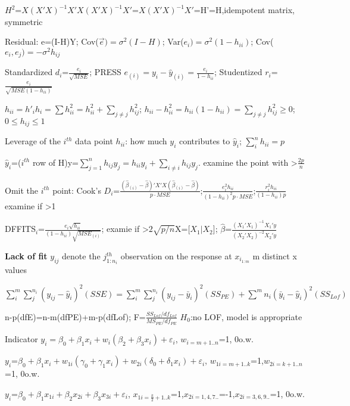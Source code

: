 \documentclass[
  10pt,
  twocolumn]{article}
\begin{document}
\(H^2\)=\(X(X'X)^{-1}X'X(X'X)^{-1}X'\)=\(X(X'X)^{-1}X'\)=H'=H,idempotent
matrix, symmetric

Residual: e=(I-H)Y; Cov(\(\vec{e})=\sigma^2(I-H)\);
Var(\(e_i)=\sigma^2(1-h_{ii})\); Cov(\(e_i,e_j)=-\sigma^2h_{ij}\)

Standardized \(d_i\)=\(\frac{e_i}{\sqrt{MSE}}\); PRESS
\(e_{(i)}=y_i-\hat y_{(i)}=\frac{e_i}{1-h_{ii}}\); Studentized
\(r_i\)=\(\frac{e_i}{\sqrt{MSE(1-h_{ii})}}\)

\(h_{ii}=h'_{i}h_{i}=\sum h_{ii}^2=h_{ii}^2+\sum_{j\neq j} h_{ij}^2\);
\(h_{ii}-h_{ii}^2=h_{ii}(1-h_{ii})=\sum_{j\neq j} h_{ij}^2\ge 0\);
\(0\le h_{ij}\le1\)

Leverage of the \(i^{th}\) data point \(h_{ii}\): how much \(y_i\)
contributes to \(\hat y_i\); \(\sum_i^nh_{ii}=p\)

\(\hat y_i\)=(\(i^{th}\) row of
H)y=\(\sum_{j=1}^nh_{ij}y_j=h_{ii}y_i+\sum_{i\neq i}h_{ij}y_j\). examine
the point with \textgreater{}\(\frac{2p}n\)

Omit the \(i^{th}\) point: Cook's
\(D_i\)=\(\frac{(\hat\beta_{(i)}-\hat\beta)'X'X(\hat\beta_{(i)}-\hat\beta)}{p\cdot MSE}\);\(\frac{e_i^2h_{ii}}{(1-h_{ii})^2p\cdot MSE}\);\(\frac{r_i^2h_{ii}}{(1-h_{ii})p}\)
examine if \textgreater1

DFFITS\(_{i}\)=\(\frac{e_i\sqrt{h_{ii}}}{(1-h_{ii})\sqrt{MSE_{(i)}}}\);
examie if \textgreater{}\(2\sqrt{p/n}\)\dotfill X={[}\(X_1|X_2\){]};
\(\hat\beta\)=\(\frac{(X_1'X_1)^{-1}X_1'y}{(X_2'X_2)^{-2}X_2'y}\)

\dotfill

\textbf{Lack of fit} \(y_{ij}\) denote the \(j_{1:n_i}^{th}\)
observation on the response at \(x_{i_{1:m}}\) m distinct x values

\(\sum^m_i\sum_{j}^{n_i}(y_{ij}-\hat y_i)^2(SSE)=\sum^m_i\sum_{j}^{n_i}(y_{ij}-\bar y_i)^2(SS_{PE})+\sum^mn_i(\bar y_{i}-\hat y_i)^2(SS_{Lof})\)

n-p(dfE)=n-m(dfPE)+m-p(dfLof);
F=\(\frac{SS_{Lof}/df_{Lof}}{MS_{PE}/df_{PE}}\) \(H_0\):no LOF, model is
appropriate

\dotfill

Indicator
\(y_i=\beta_0+\beta_1x_i+w_i(\beta_2+\beta_3x_i)+\varepsilon_i\),
\(w_{i=m+1..n}\)=1, 0o.w.

\(y_i\)=\(\beta_0+\beta_1x_i+w_{1i}(\gamma_0+\gamma_1x_i)+w_{2i}(\delta_0+\delta_1x_i)+\varepsilon_i\),
\(w_{1i=m+1..k}\)=1,\(w_{2i=k+1..n}\)=1, 0o.w.

\(y_i\)=\(\beta_0+\beta_1x_{1i}+\beta_2x_{2i}+\beta_3x_{3i}+\varepsilon_i\),
\(x_{1i=\frac{k}2+1..k}\)=1,\(x_{2i=1,4,7..}\)=-1,\(x_{2i=3,6,9..}\)=1,
0o.w.
\end{document}
